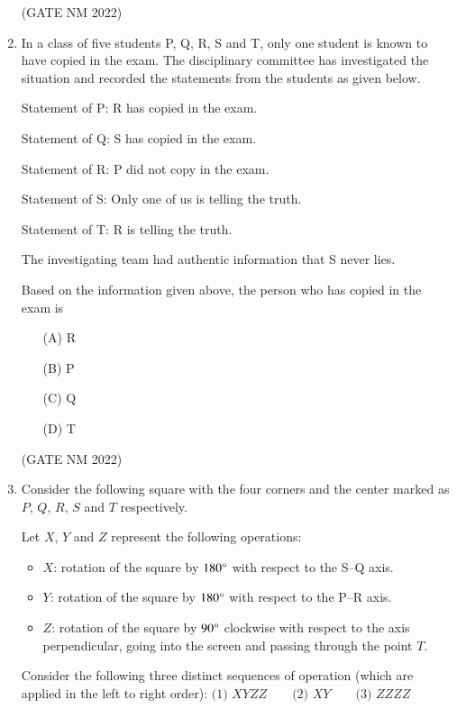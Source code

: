 \documentclass[journal,12pt,onecolumn]{IEEEtran}
\theoremstyle{remark}
\begin{document}
\begin{enumerate}
\hfill(GATE NM 2022)






\item  In a class of five students P, Q, R, S and T, only one student is known to have copied in the exam. The disciplinary committee has investigated the situation and recorded the statements from the students as given below.  

{Statement of P:} R has copied in the exam.  

{Statement of Q:} S has copied in the exam.  

{Statement of R:} P did not copy in the exam.  

{Statement of S:} Only one of us is telling the truth.  

{Statement of T:} R is telling the truth.  

The investigating team had authentic information that S never lies.  

Based on the information given above, the person who has copied in the exam is  

\begin{enumerate}
    \item[(A)] R
    \item[(B)] P
    \item[(C)] Q
    \item[(D)] T
\end{enumerate}

\hfill(GATE NM 2022)








\item  Consider the following square with the four corners and the center marked as $P$, $Q$, $R$, $S$ and $T$ respectively.  

Let $X$, $Y$ and $Z$ represent the following operations:  
\begin{itemize}
	\item $X$: rotation of the square by $180{\degree}$ with respect to the S--Q axis.
	\item $Y$: rotation of the square by $180{\degree}$ with respect to the P--R axis.
	\item $Z$: rotation of the square by $90{\degree}$ clockwise with respect to the axis perpendicular, going into the screen and passing through the point $T$.
\end{itemize}

Consider the following three distinct sequences of operation (which are applied in the left to right order):  
$
\text{(1) } XYZZ \quad\quad \text{(2) } XY \quad\quad \text{(3) } ZZZZ
$


\end{enumerate}
\end{document}

